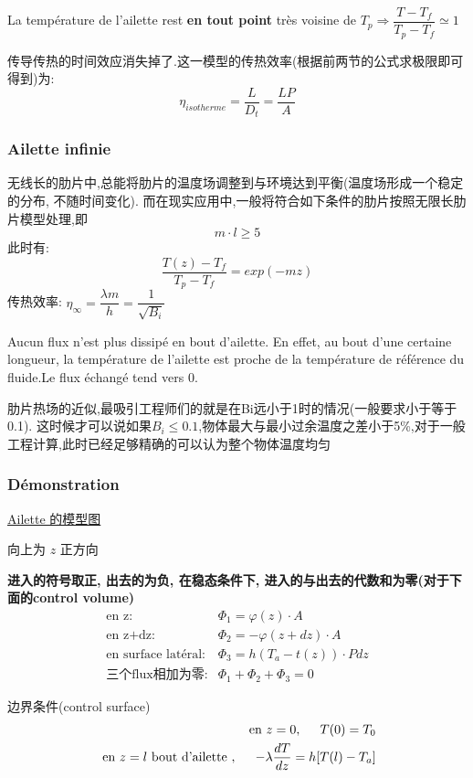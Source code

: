 \documentclass{article}
\begin{document}
La temp\'erature de l'ailette rest \textbf{en tout point} tr\`es voisine de $T_p  \Rightarrow \dfrac{ T - T_f}{T_p - T_f}\simeq 1$

传导传热的时间效应消失掉了.这一模型的传热效率(根据前两节的公式求极限即可得到)为:
$$
\eta_{isotherme} = \dfrac{L}{D_t} = \dfrac{LP}{A}
$$

\subsubsection{Ailette infinie}
无线长的肋片中,总能将肋片的温度场调整到与环境达到平衡(温度场形成一个稳定的分布, 不随时间变化).
而在现实应用中,一般将符合如下条件的肋片按照无限长肋片模型处理,即
$$ m\cdot l \geq 5 $$
此时有:
$$ \frac{T(z)-T_f}{T_p - T_f}=exp(-mz) $$
传热效率: $\eta_{\infty} = \dfrac{\lambda m}{h} = \dfrac{1}{\sqrt{B_i}}$

Aucun flux n'est plus dissip\'e en bout d'ailette. En effet, au bout d'une certaine longueur, la temp\'erature de l'ailette est proche de la temp\'erature de r\'ef\'erence du fluide.Le flux \'echang\'e tend vers $0$.

肋片热场的近似,最吸引工程师们的就是在Bi远小于1时的情况(一般要求小于等于0.1).
这时候才可以说如果$B_i \leq 0.1$,物体最大与最小过余温度之差小于5\%,对于一般工程计算,此时已经足够精确的可以认为整个物体温度均匀

\subsubsection{D\'emonstration}
\href{http://i.imgbox.com/IttTCHOi.png}{Ailette 的模型图}

向上为 $z$ 正方向

\textbf{进入的符号取正, 出去的为负, 在稳态条件下, 进入的与出去的代数和为零(对于下面的control volume)}
\begin{eqnarray}
\text{en z:} & \Phi_1=\varphi(z)\cdot A \\
\text{en z+dz:} &\Phi_2=-\varphi(z+dz) \cdot A\\
\text{en surface lat\'eral:} & \Phi_3=h(T_a - t(z)) \cdot P dz \\
\text{三个flux相加为零:}  &\Phi_1 + \Phi_2 + \Phi_3 = 0
\end{eqnarray}

边界条件(control surface)
\begin{equation}
\begin{aligned}
\text{ en } z = 0, \hspace{0.5cm} T(0) = T_0 \\
\text{ en } z = l \text{ bout d'ailette }, \hspace{0.5cm} - \lambda \frac{dT}{dz} = h[T(l) - T_a]
\end{aligned}
\end{equation}
\end{document}
